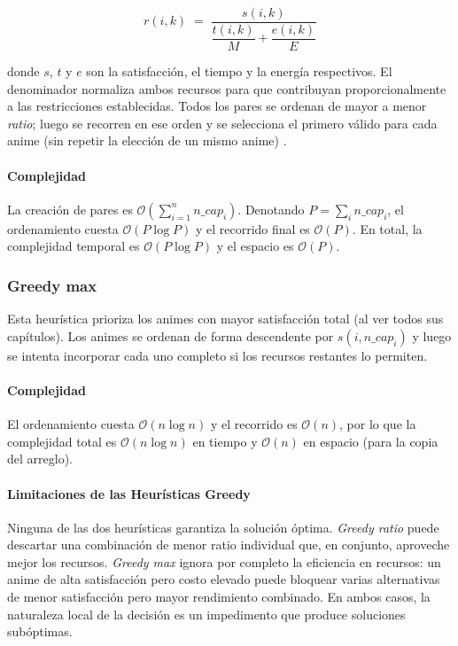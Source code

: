 \[
    r(i,k) \;=\; \frac{s(i,k)}{\dfrac{t(i,k)}{M} + \dfrac{e(i,k)}{E}}
\]

donde $s$, $t$ y $e$ son la satisfacción, el tiempo y la energía respectivos.
El denominador normaliza ambos recursos para que contribuyan proporcionalmente a las restricciones establecidas.
Todos los pares se ordenan de mayor a menor \textit{ratio}; luego se recorren en ese orden y se selecciona el primero válido para cada anime (sin repetir la elección
de un mismo anime) \parencite{gfg_fractional_knapsack}.

\paragraph{Complejidad}

La creación de pares es $\mathcal{O}\!\left(\sum_{i=1}^n n\_cap_i\right)$.
Denotando $P = \sum_i n\_cap_i$, el ordenamiento cuesta $\mathcal{O}(P \log P)$
y el recorrido final es $\mathcal{O}(P)$.  En total, la complejidad temporal
es $\mathcal{O}(P \log P)$ y el espacio es $\mathcal{O}(P)$.

\subsubsection*{Greedy max}
Esta heurística prioriza los animes con mayor satisfacción total (al ver todos
sus capítulos).  Los animes se ordenan de forma descendente por
$s(i, n\_cap_i)$ y luego se intenta incorporar cada uno completo si los
recursos restantes lo permiten.

\paragraph{Complejidad}

El ordenamiento cuesta $\mathcal{O}(n \log n)$ y el recorrido es
$\mathcal{O}(n)$, por lo que la complejidad total es
$\mathcal{O}(n \log n)$ en tiempo y $\mathcal{O}(n)$ en espacio (para la copia
del arreglo).

\paragraph{Limitaciones de las Heurísticas Greedy}

Ninguna de las dos heurísticas garantiza la solución óptima.  \textit{Greedy
ratio} puede descartar una combinación de menor ratio individual que, en
conjunto, aproveche mejor los recursos.  \textit{Greedy max} ignora por
completo la eficiencia en recursos: un anime de alta satisfacción pero costo
elevado puede bloquear varias alternativas de menor satisfacción pero mayor
rendimiento combinado.  En ambos casos, la naturaleza local de la decisión es un impedimento que produce soluciones subóptimas.


